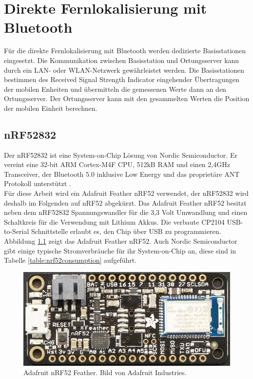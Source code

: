 \chapter{Direkte Fernlokalisierung mit Bluetooth}
\label{ch:phase3}
Für die direkte Fernlokalisierung mit Bluetooth werden dedizierte Basisstationen eingesetzt. 
Die Kommunikation zwischen Basisstation und Ortungsserver kann durch ein LAN- oder WLAN-Netzwerk gewährleistet werden.
Die Basisstationen bestimmen des Received Signal Strength Indicator eingehender Übertragungen der mobilen Enheiten und übermitteln die gemessenen Werte dann an den Ortungsserver.
Der Ortungsserver kann mit den gesammelten Werten die Position der mobilen Einheit berechnen.

\section{nRF52832}
Der nRF52832 ist eine System-on-Chip Lösung von Nordic Semiconductor.
Er vereint eine 32-bit ARM Cortex-M4F CPU, 512kB RAM und einen 2,4GHz Transceiver, der Bluetooth 5.0 inklusive Low Energy und das proprietäre ANT Protokoll unterstützt \cite{nordic2017nrf}.\\
Für diese Arbeit wird ein Adafruit Feather nRF52 verwendet, der nRF52832 wird deshalb im Folgenden auf nRF52 abgekürzt.
Das Adafruit Feather nRF52 besitzt neben dem nRF52832 Spannungswandler für die 3,3 Volt Umwandlung und einen Schaltkreis für die Verwendung mit Lithium Akkus. Die verbaute CP2104 USB-to-Serial Schnittstelle erlaubt es, den Chip über USB zu programmieren.\\
Abbildung \ref{fig:nrf52layout} zeigt das Adafruit Feather nRF52.
Auch Nordic Semiconductor gibt einige typische Stromverbräuche für ihr System-on-Chip an, diese sind in Tabelle \ref{table:nrf52consumption} aufgeführt.

\begin{figure}[h]
  \centering
	\includegraphics[width=\textwidth]{images/nrf52ada.png}
  \caption{Adafruit nRF52 Feather. Bild von Adafruit Industries.}
  \label{fig:nrf52layout}
\end{figure}

